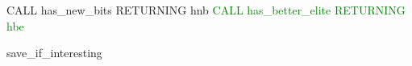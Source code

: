 \begin{algorithm}
    CALL has\_new\_bits RETURNING hnb\;
    \textcolor{green}{CALL has\_better\_elite RETURNING hbe}\;
    \caption{save\_if\_interesting}
    \label{algo:ifi-waffle}
\end{algorithm}